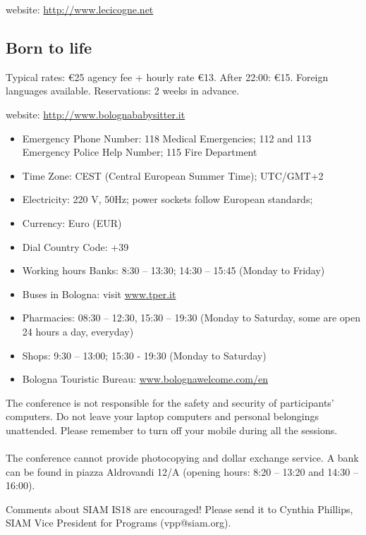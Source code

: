 \smallskip\noindent website: \href{http://www.lecicogne.net}{http://www.lecicogne.net}

\subsection*{Born to life}
Typical rates: \euro 25 agency fee + hourly rate \euro 13. After 22:00: \euro 15. Foreign languages available. Reservations: 2 weeks in advance.

\smallskip\noindent website: \href{http://www.bolognababysitter.it}{http://www.bolognababysitter.it}


\begin{itemize}
  \item Emergency Phone Number: 118 Medical Emergencies; 112 and 113 Emergency Police Help Number; 115 Fire Department 
  \item Time Zone: CEST (Central European Summer Time); UTC/GMT+2
  \item Electricity: 220 V, 50Hz; power sockets follow European standards;
  \item Currency: Euro (EUR)
  \item Dial Country Code: +39
  \item Working hours Banks: 8:30 -- 13:30; 14:30 -- 15:45 (Monday to Friday) 
  \item Buses in Bologna: visit \href{https://www.tper.it/ }{www.tper.it}
  \item Pharmacies: 08:30 -- 12:30, 15:30 -- 19:30 (Monday to Saturday, some are open 24 hours a day, everyday) 
  \item Shops: 9:30 -- 13:00; 15:30 - 19:30 (Monday to Saturday) 
  \item Bologna Touristic Bureau: \href{https://www.bolognawelcome.com/en}{www.bolognawelcome.com/en}
\end{itemize}

The conference is not responsible for the safety and security of participants' computers. 
Do not leave your laptop computers and personal belongings unattended. 
Please remember to turn off your mobile during all the sessions.\\\\ 
The conference cannot provide photocopying and dollar exchange service. 
A bank can be found in piazza Aldrovandi 12/A (opening hours: 8:20 -- 13:20 and 14:30 -- 16:00).

Comments about SIAM IS18 are encouraged! Please send it to Cynthia Phillips, SIAM Vice President for Programs (vpp@siam.org).
